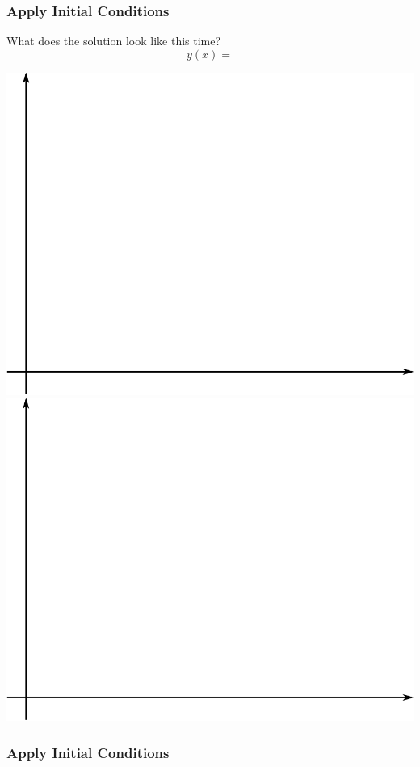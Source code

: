 \documentclass[fleqn]{beamer} %
\newcommand{\sectionIIIsubsectionIVtitle}{Apply Initial Conditions}
\begin{document}
			\begin{frame}
				\frametitle{\sectionIIIsubsectionIVtitle}
				\bigskip
					What does the solution look like this time?\\

				\[y(x)=\] 

				\includegraphics[scale=0.15]{images/lecture1_fig2.png}\hspace{5mm} \includegraphics[scale=0.15]{images/lecture1_fig2.png}
				
				\btVFill 
			\end{frame}

			\begin{frame}
				\frametitle{\sectionIIIsubsectionIVtitle}
				\bigskip

				
				
				
				\btVFill 
			\end{frame}
\end{document}
